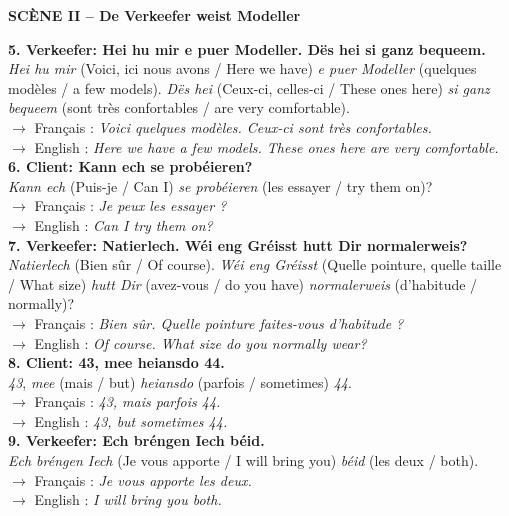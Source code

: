 \noindent\textbf{SCÈNE II -- De Verkeefer weist Modeller}

\noindent\textbf{5. Verkeefer: Hei hu mir e puer Modeller. Dës hei si ganz bequeem.}\\
\textit{Hei hu mir} (Voici, ici nous avons / Here we have) \textit{e puer Modeller} (quelques modèles / a few models). \textit{Dës hei} (Ceux-ci, celles-ci / These ones here) \textit{si ganz bequeem} (sont très confortables / are very comfortable).\\
$\rightarrow$ Français : \textit{Voici quelques modèles. Ceux-ci sont très confortables.}\\
$\rightarrow$ English : \textit{Here we have a few models. These ones here are very comfortable.}\\[0.5em]

\noindent\textbf{6. Client: Kann ech se probéieren?}\\
\textit{Kann ech} (Puis-je / Can I) \textit{se probéieren} (les essayer / try them on)?\\
$\rightarrow$ Français : \textit{Je peux les essayer ?}\\
$\rightarrow$ English : \textit{Can I try them on?}\\[0.5em]

\noindent\textbf{7. Verkeefer: Natierlech. Wéi eng Gréisst hutt Dir normalerweis?}\\
\textit{Natierlech} (Bien sûr / Of course). \textit{Wéi eng Gréisst} (Quelle pointure, quelle taille / What size) \textit{hutt Dir} (avez-vous / do you have) \textit{normalerweis} (d'habitude / normally)?\\
$\rightarrow$ Français : \textit{Bien sûr. Quelle pointure faites-vous d'habitude ?}\\
$\rightarrow$ English : \textit{Of course. What size do you normally wear?}\\[0.5em]

\noindent\textbf{8. Client: 43, mee heiansdo 44.}\\
\textit{43}, \textit{mee} (mais / but) \textit{heiansdo} (parfois / sometimes) \textit{44}.\\
$\rightarrow$ Français : \textit{43, mais parfois 44.}\\
$\rightarrow$ English : \textit{43, but sometimes 44.}\\[0.5em]

\noindent\textbf{9. Verkeefer: Ech bréngen Iech béid.}\\
\textit{Ech bréngen Iech} (Je vous apporte / I will bring you) \textit{béid} (les deux / both).\\
$\rightarrow$ Français : \textit{Je vous apporte les deux.}\\
$\rightarrow$ English : \textit{I will bring you both.}\\[0.5em]

